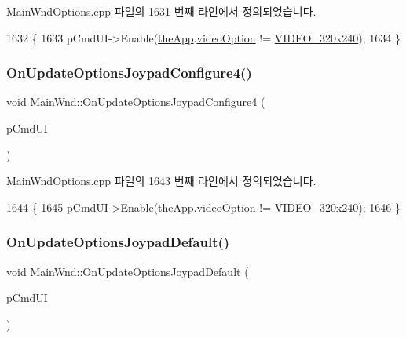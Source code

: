 Main\+Wnd\+Options.\+cpp 파일의 1631 번째 라인에서 정의되었습니다.


\begin{DoxyCode}
1632 \{
1633   pCmdUI->Enable(\mbox{\hyperlink{_v_b_a_8cpp_a8095a9d06b37a7efe3723f3218ad8fb3}{theApp}}.\mbox{\hyperlink{class_v_b_a_a17dac073149c897f770c00ed7098ad32}{videoOption}} != \mbox{\hyperlink{_v_b_a_8h_a531c35e38ede3ea4e5ba5afb24b29493a658665cfbdbd908bdb77babe125d0341}{VIDEO\_320x240}});
1634 \}
\end{DoxyCode}
\mbox{\label{class_main_wnd_ab4e1c44549ff60b9c38c2ef34b7139a1}} 
\subsubsection{\texorpdfstring{On\+Update\+Options\+Joypad\+Configure4()}{OnUpdateOptionsJoypadConfigure4()}}
{\footnotesize\ttfamily void Main\+Wnd\+::\+On\+Update\+Options\+Joypad\+Configure4 (\begin{DoxyParamCaption}\item[{C\+Cmd\+UI $\ast$}]{p\+Cmd\+UI }\end{DoxyParamCaption})\hspace{0.3cm}{\ttfamily [protected]}}



Main\+Wnd\+Options.\+cpp 파일의 1643 번째 라인에서 정의되었습니다.


\begin{DoxyCode}
1644 \{
1645   pCmdUI->Enable(\mbox{\hyperlink{_v_b_a_8cpp_a8095a9d06b37a7efe3723f3218ad8fb3}{theApp}}.\mbox{\hyperlink{class_v_b_a_a17dac073149c897f770c00ed7098ad32}{videoOption}} != \mbox{\hyperlink{_v_b_a_8h_a531c35e38ede3ea4e5ba5afb24b29493a658665cfbdbd908bdb77babe125d0341}{VIDEO\_320x240}});
1646 \}
\end{DoxyCode}
\mbox{\label{class_main_wnd_ae916bc94a817e76c6520085d2eeb0118}} 
\subsubsection{\texorpdfstring{On\+Update\+Options\+Joypad\+Default()}{OnUpdateOptionsJoypadDefault()}}
{\footnotesize\ttfamily void Main\+Wnd\+::\+On\+Update\+Options\+Joypad\+Default (\begin{DoxyParamCaption}\item[{C\+Cmd\+UI $\ast$}]{p\+Cmd\+UI }\end{DoxyParamCaption})}




